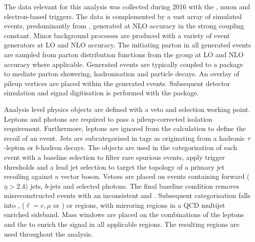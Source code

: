 The data relevant for this analysis was collected during 2016 with the \ptmiss, muon and electron-based triggers. The data is complemented by a vast array of simulated events, predominantly from \IVj, generated at NLO accuracy in the strong coupling constant. Minor background processes are produced with a variety of event generators at LO and NLO accuracy. The initiating parton in all generated events are sampled from parton distribution functions from the \NNPDF group at LO and NLO accuracy where applicable. Generated events are typically coupled to a package to mediate parton showering, hadronisation and particle decays. An overlay of pileup vertices are placed within the generated events. Subsequent detector simulation and signal digitisation is performed with the \GEANT package.

Analysis level physics objects are defined with a veto and selection working point. Leptons and photons are required to pass a pileup-corrected isolation requirement. Furthermore, leptons are ignored from the \ptmiss calculation to define the recoil of an event. Jets are subcategorised in tags as originating from a hadronic $\tau$-lepton or $b$-hadron decays. The objects are used in the categorisation of each event with a baseline selection to filter rare spurious \ptmiss events, apply trigger thresholds and a lead jet selection to target the topology of a primary jet recoiling against a vector boson. Vetoes are placed on events containing forward (${\eta>2.4}$) jets, $b$-jets and selected photons. The final baseline condition removes misreconstructed events with an inconsistent \ptmiss and \ptmisscalo. Subsequent categorisation falls into \metplusjets, \ellplusjets ($\ell=e,\mu$ or \Ptauh) or \diellplusjets regions, with mirroring regions in a QCD multijet enriched sideband. Mass windows are placed on the combinations of the leptons and the \ptmiss to enrich the signal in all applicable regions. The resulting regions are used throughout the analysis.
